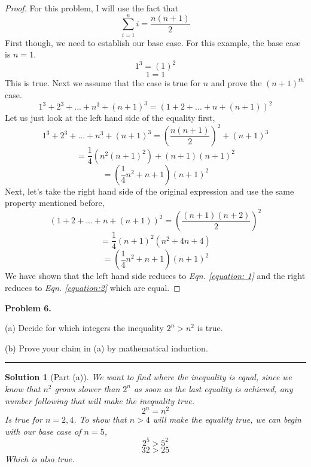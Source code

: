 \documentclass[leqno]{article}
\theoremstyle{nonumberplain}
\newtheorem{proof}{Proof}
\newtheorem{solution}{Solution}
\begin{document}
\begin{proof}
For this problem, I will use the fact that
\[
\sum_{i=1}^n i = \frac{n(n+1)}{2}
\]
First though, we need to establish our base case.  For this example, the base case is $n=1$.
\[
1^3=(1)^2
\]
\[
1=1
\]
This is true.  Next we assume that the case is true for $n$ and prove the $(n+1)^{th}$ case.  
\[
1^3 + 2^3 +...+n^3 + (n+1)^3 = (1+2+...+n+(n+1))^2
\]
Let us just look at the left hand side of the equality first,
\[
1^3 + 2^3 +...+n^3 + (n+1)^3=\left(\frac{n(n+1)}{2}\right)^2 + (n+1)^3
\]
\[
=\frac{1}{4}(n^2 (n+1)^2)+(n+1)(n+1)^2
\]
\begin{equation}
\label{equation: 1}
=(\frac{1}{4} n^2 +n+1)(n+1)^2
\end{equation}
Next, let's take the right hand side of the original expression and use the same property mentioned before,
\[
(1+2+...+n+(n+1))^2=\left( \frac{(n+1)(n+2)}{2} \right)^2
\]
\[
=\frac{1}{4}(n+1)^2(n^2+4n+4)
\]
\begin{equation}
\label{equation:2}
=(\frac{1}{4} n^2 +n+1)(n+1)^2
\end{equation}
We have shown that the left hand side reduces to \emph{Eqn. \ref{equation: 1}} and the right reduces to \emph{Eqn. \ref{equation:2}} which are equal.
\end{proof}
\pagebreak




\noindent\textbf{Problem 6.} 

(a) Decide for which integers the inequality $2^n > n^2$ is true.

(b) Prove your claim in (a) by mathematical induction.

\noindent\rule[0.5ex]{\linewidth}{1pt}

\begin{solution}[Part (a)] 
We want to find where the inequality is equal, since we know that $n^2$ grows slower than $2^n$ as soon as the last equality is achieved, any number following that will make the inequality true.  
\[
2^n = n^2
\]
Is true for $n=2,4$.  To show that $n>4$ will make the equality true, we can begin with our base case of $n=5$,
\[
2^5>5^2
\]
\[
32>25
\]
Which is also true.
\end{solution}
\end{document}
